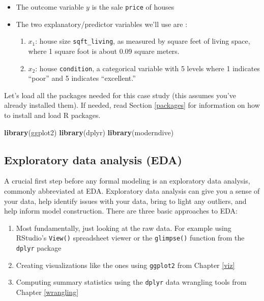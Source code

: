 \documentclass[12pt, krantz2,]{krantz}
\makeatletter
\newenvironment{Shaded}{\begin{snugshade}}{\end{snugshade}}
\newcommand{\KeywordTok}[1]{\textcolor[rgb]{0.27,0.27,0.27}{\textbf{#1}}}
\newcommand{\NormalTok}[1]{#1}
\providecommand{\tightlist}{%
  \setlength{\itemsep}{0pt}\setlength{\parskip}{0pt}}
\newenvironment{kframe}{%
\medskip{}
\setlength{\fboxsep}{.8em}
 \def\at@end@of@kframe{}%
 \ifinner\ifhmode%
  \def\at@end@of@kframe{\end{minipage}}%
  \begin{minipage}{\columnwidth}%
 \fi\fi%
 \def\FrameCommand##1{\hskip\@totalleftmargin \hskip-\fboxsep
 \colorbox{shadecolor}{##1}\hskip-\fboxsep
     \hskip-\linewidth \hskip-\@totalleftmargin \hskip\columnwidth}%
 \MakeFramed {\advance\hsize-\width
   \@totalleftmargin\z@ \linewidth\hsize
   \@setminipage}}%
 {\par\unskip\endMakeFramed%
 \at@end@of@kframe}
\renewenvironment{Shaded}{\begin{kframe}}{\end{kframe}}
\makeatother
\begin{document}
\begin{itemize}
\tightlist
\item
  The outcome variable \(y\) is the sale \texttt{price} of houses
\item
  The two explanatory/predictor variables we'll use are :

  \begin{enumerate}
  \def\labelenumi{\arabic{enumi}.}
  \tightlist
  \item
    \(x_1\): house size \texttt{sqft\_living}, as measured by square feet of living space, where 1 square foot is about 0.09 square meters.
  \item
    \(x_2\): house \texttt{condition}, a categorical variable with 5 levels where 1 indicates ``poor'' and 5 indicates ``excellent.''
  \end{enumerate}
\end{itemize}

Let's load all the packages needed for this case study (this assumes you've already installed them). If needed, read Section \ref{packages} for information on how to install and load R packages.

\begin{Shaded}
\begin{Highlighting}[]
\KeywordTok{library}\NormalTok{(ggplot2)}
\KeywordTok{library}\NormalTok{(dplyr)}
\KeywordTok{library}\NormalTok{(moderndive)}
\end{Highlighting}
\end{Shaded}

\hypertarget{house-prices-EDA-I}{%
\subsection{Exploratory data analysis (EDA)}\label{house-prices-EDA-I}}

A crucial first step before any formal modeling is an exploratory data analysis, commonly abbreviated at EDA. Exploratory data analysis can give you a sense of your data, help identify issues with your data, bring to light any outliers, and help inform model construction. There are three basic approaches to EDA:

\begin{enumerate}
\def\labelenumi{\arabic{enumi}.}
\tightlist
\item
  Most fundamentally, just looking at the raw data. For example using RStudio's \texttt{View()} spreadsheet viewer or the \texttt{glimpse()} function from the \texttt{dplyr} package
\item
  Creating visualizations like the ones using \texttt{ggplot2} from Chapter \ref{viz}
\item
  Computing summary statistics using the \texttt{dplyr} data wrangling tools from Chapter \ref{wrangling}
\end{enumerate}
\end{document}
